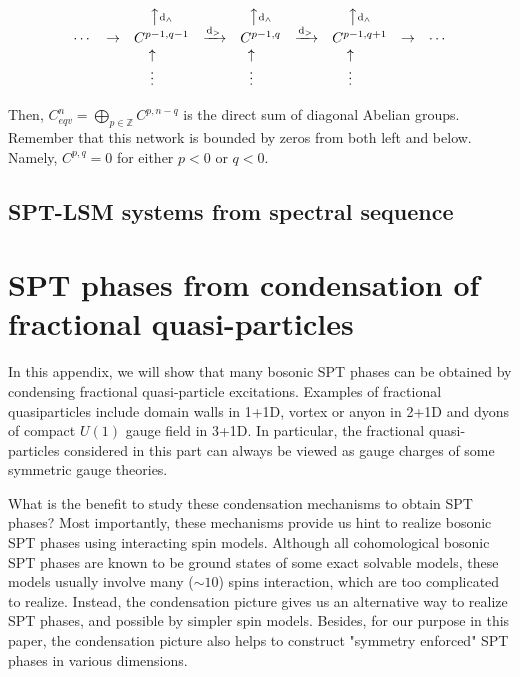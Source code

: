 \documentclass[reprint,amsmath,amssymb,aps,pra,]{revtex4-1}
\newcommand{\dd}{\mathrm{d}} %
\newcommand{\ZZ}{\mathbb{Z}} %
\begin{document}
\begin{widetext}
\begin{align}
\begin{matrix}
    & & \big\uparrow \text{\scriptsize$\dd_\wedge$} & & \big\uparrow \text{\scriptsize$\dd_\wedge$} && \big\uparrow  \text{\scriptsize$\dd_\wedge$} & & \notag\\
    \cdots & \rightarrow & C^{p-1,q-1} & \xrightarrow{\dd_>} & C^{p-1,q} & \xrightarrow{\dd_>} & C^{p-1,q+1} & \rightarrow & \cdots\notag\\
      & & \uparrow\quad\  & & \uparrow\quad\ & & \uparrow\quad\ & &\notag\\
      & & \vdots\quad\  & & \vdots\quad\ & & \vdots\quad\ & &
  \end{matrix}
    \label{}
  \end{align}
\end{widetext}
Then, $C^{n}_{eqv}=\bigoplus_{p\in\ZZ} C^{p,n-q}$ is the direct sum of diagonal Abelian groups.
Remember that this network is bounded by zeros from both left and below.
Namely, $C^{p,q}=0$ for either $p<0$ or $q<0$.


\subsection{SPT-LSM systems from spectral sequence}


\section{SPT phases from condensation of fractional quasi-particles}\label{app:SPT_condensation}
In this appendix, we will show that many bosonic SPT phases can be obtained by condensing fractional quasi-particle excitations.
Examples of fractional quasiparticles include domain walls in 1+1D, vortex or anyon in 2+1D and dyons of compact $U(1)$ gauge field in 3+1D.
In particular, the fractional quasi-particles considered in this part can always be viewed as gauge charges of some symmetric gauge theories.

What is the benefit to study these condensation mechanisms to obtain SPT phases?
Most importantly, these mechanisms provide us hint to realize bosonic SPT phases using interacting spin models.
Although all cohomological bosonic SPT phases are known to be ground states of some exact solvable models, these models usually involve many ($\sim 10$) spins interaction, which are too complicated to realize.
Instead, the condensation picture gives us an alternative way to realize SPT phases, and possible by simpler spin models.
Besides, for our purpose in this paper, the condensation picture also helps to construct "symmetry enforced" SPT phases in various dimensions.
\end{document}

